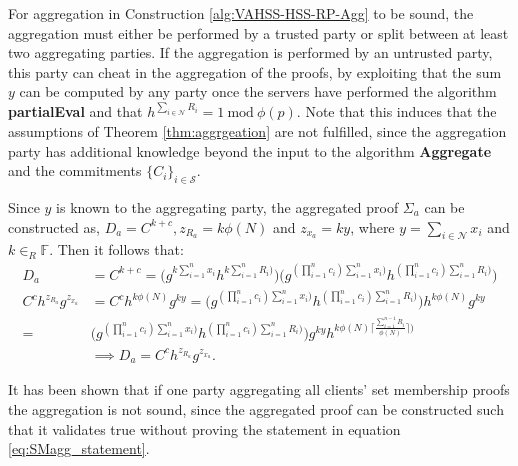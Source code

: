 For aggregation in Construction \ref{alg:VAHSS-HSS-RP-Agg} to be sound, the aggregation must either be performed by a trusted party or split between at least two aggregating parties. If the aggregation is performed by an untrusted party, this party can cheat in the aggregation of the proofs, by exploiting that the sum $y$ can be computed by any party once the servers have performed the algorithm \textbf{partialEval} and that  $h^{\sum_{i\in\mathcal{N}} R_i } =1 \: \text{mod}\:  \phi(p)$. Note that this induces that  the assumptions of Theorem \ref{thm:aggrgeation} are not fulfilled, since the aggregation party has additional knowledge beyond the input to the algorithm \textbf{Aggregate} and the commitments $\{C_i\}_{i\in\mathcal{S}}$. %

Since $y$ is known to the aggregating party, the aggregated proof $\Sigma_a$ can be constructed as, $D_a=C^{k+c}, z_{R_a} = k\phi (N)$ and $z_{x_a} = k y$, where $y= \sum_{i\in\mathcal{N}} x_i$ and $k\in_R \mathds{F}$. Then it follows that:
\begin{align*}
D_a &= C^{k+c}= \big( g^ { k \sum_{i=1}^n x_i } h^{ k  \sum_{i=1}^n R_i ) } \big)   \big( g^{ (  \prod_{i=1}^n c_i ) \sum_{i=1}^n x_i ) } h^{ ( \prod_{i=1}^n c_i ) \sum_{i=1}^n R_i ) } \big)   \\
 C^c h^{z_{R_a}}g^{z_{x_a}} &= C^c h^{k \phi (N) } g^{k y} =  \big( g^{ (  \prod_{i=1}^n c_i ) \sum_{i=1}^n x_i ) } h^{ ( \prod_{i=1}^n c_i ) \sum_{i=1}^n R_i ) } \big) h^{k\phi (N)} g^{ky}\\
= &  \big( g^{ (  \prod_{i=1}^n c_i ) \sum_{i=1}^n x_i ) } h^{ ( \prod_{i=1}^n c_i ) \sum_{i=1}^n R_i ) } \big)g^ { k y} h^{ k  \phi(N)\lceil \frac{\sum_{i=1}^{n-1}R_i}{\phi(N)}\rceil ) }\\
& \implies D_a = C^ch^{z_{R_a}}g^{z_{x_a}}.
\end{align*}

It has been shown that if one party aggregating all clients' set membership proofs the aggregation is not sound, since the aggregated proof can be constructed such that it validates true without proving the statement in equation \ref{eq:SMagg_statement}. 

